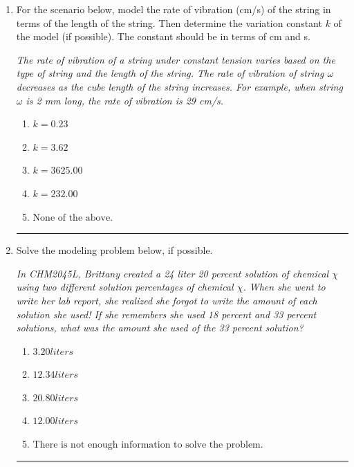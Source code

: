 \documentclass[14pt]{extbook}
\newcommand{\litem}[1]{\item#1\hspace*{-1cm}\rule{\textwidth}{0.4pt}}
\begin{document}
\begin{enumerate}
{\begin{enumerate}[label=\Alph*.]
\end{enumerate} }
\litem{
For the scenario below, model the rate of vibration (cm/s) of the string in terms of the length of the string. Then determine the variation constant $k$ of the model (if possible). The constant should be in terms of cm and s.
\begin{center}
    \textit{ The rate of vibration of a string under constant tension varies based on the type of string and the length of the string. The rate of vibration of string $\omega$ decreases as the cube length of the string increases. For example, when string $\omega$ is 2 mm long, the rate of vibration is 29 cm/s. }
\end{center}
\begin{enumerate}[label=\Alph*.]
\item \( k = 0.23 \)
\item \( k = 3.62 \)
\item \( k = 3625.00 \)
\item \( k = 232.00 \)
\item \( \text{None of the above.} \)

\end{enumerate} }
\litem{
Solve the modeling problem below, if possible.
\begin{center}
    \textit{ In CHM2045L, Brittany created a 24 liter 20 percent solution of chemical $\chi$ using two different solution percentages of chemical $\chi$. When she went to write her lab report, she realized she forgot to write the amount of each solution she used! If she remembers she used 18 percent and 33 percent solutions, what was the amount she used of the 33 percent solution? }
\end{center}
\begin{enumerate}[label=\Alph*.]
\item \( 3.20 liters \)
\item \( 12.34 liters \)
\item \( 20.80 liters \)
\item \( 12.00 liters \)
\item \( \text{There is not enough information to solve the problem.} \)


\end{enumerate}}
\end{enumerate}
\end{document}
